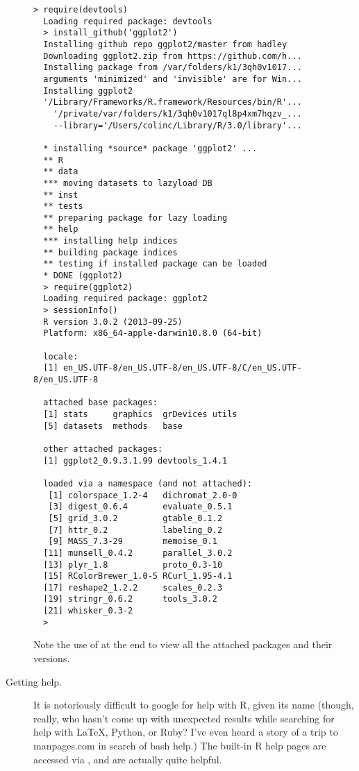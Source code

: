 \begin{description}
  \begin{lstlisting}[style=bash]
  > require(devtools)
  Loading required package: devtools
  > install_github('ggplot2')
  Installing github repo ggplot2/master from hadley
  Downloading ggplot2.zip from https://github.com/h...
  Installing package from /var/folders/k1/3qh0v1017...
  arguments 'minimized' and 'invisible' are for Win...
  Installing ggplot2
  '/Library/Frameworks/R.framework/Resources/bin/R'...
    '/private/var/folders/k1/3qh0v1017ql8p4xm7hqzv_...
    --library='/Users/colinc/Library/R/3.0/library'...

  * installing *source* package 'ggplot2' ...
  ** R
  ** data
  *** moving datasets to lazyload DB
  ** inst
  ** tests
  ** preparing package for lazy loading
  ** help
  *** installing help indices
  ** building package indices
  ** testing if installed package can be loaded
  * DONE (ggplot2)
  > require(ggplot2)
  Loading required package: ggplot2
  > sessionInfo()
  R version 3.0.2 (2013-09-25)
  Platform: x86_64-apple-darwin10.8.0 (64-bit)

  locale:
  [1] en_US.UTF-8/en_US.UTF-8/en_US.UTF-8/C/en_US.UTF-8/en_US.UTF-8

  attached base packages:
  [1] stats     graphics  grDevices utils    
  [5] datasets  methods   base     

  other attached packages:
  [1] ggplot2_0.9.3.1.99 devtools_1.4.1    

  loaded via a namespace (and not attached):
   [1] colorspace_1.2-4   dichromat_2.0-0   
   [3] digest_0.6.4       evaluate_0.5.1    
   [5] grid_3.0.2         gtable_0.1.2      
   [7] httr_0.2           labeling_0.2      
   [9] MASS_7.3-29        memoise_0.1       
  [11] munsell_0.4.2      parallel_3.0.2    
  [13] plyr_1.8           proto_0.3-10      
  [15] RColorBrewer_1.0-5 RCurl_1.95-4.1    
  [17] reshape2_1.2.2     scales_0.2.3      
  [19] stringr_0.6.2      tools_3.0.2       
  [21] whisker_0.3-2     
  > 
  \end{lstlisting}
  Note the use of  at the end to view all the attached
  packages and their versions.


\item[Getting help.] It is notoriously difficult to google for help with 
  R, given its name (though, really, who hasn't come up with unexpected 
  results while searching for help with \LaTeX, Python, or Ruby?  I've even
  heard a story of a trip to manpages.com in search of bash help.) The built-in
  R help pages are accessed via , and are actually quite helpful.


\end{description}
